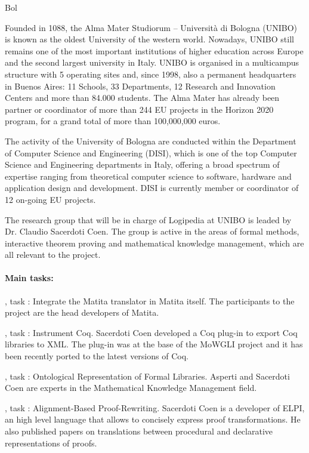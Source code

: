 \begin{sitedescription}{Bol}


Founded in 1088, the Alma Mater Studiorum – Università di Bologna (UNIBO) is known as the oldest University of the western world. Nowadays, UNIBO still remains one of the most important institutions of higher education across Europe and the second largest university in Italy. UNIBO is organised in a multicampus structure with 5 operating sites and, since 1998, also a permanent headquarters in Buenos Aires: 11 Schools, 33 Departments, 12 Research and Innovation Centers and more than 84.000 students. The Alma Mater has already been partner or coordinator of more than 244 EU projects in the Horizon 2020 program, for a grand total of more than 100,000,000 euros.

The activity of the University of Bologna are conducted within the Department of Computer Science and Engineering (DISI), which is one of the top Computer Science and Engineering departments in Italy, offering a broad spectrum of expertise ranging from theoretical computer science to software, hardware and application design and development. DISI is currently member or coordinator of 12 on-going EU projects.

The research group that will be in charge of Logipedia at UNIBO is leaded by Dr. Claudio Sacerdoti Coen. The group is active in the areas of formal methods, interactive theorem proving and mathematical knowledge management, which are all relevant to the project.

\paragraph*{Main tasks:}

\begin{compactitem}
\item {}, task : Integrate the Matita translator in Matita itself. The participants to the project are the head developers of Matita.
\item {}, task : Instrument Coq. Sacerdoti Coen developed a Coq plug-in to export Coq libraries to XML. The plug-in was at the base of the MoWGLI project and it has been recently ported to the latest versions of Coq.
\item {}, task : Ontological Representation of Formal Libraries. Asperti and Sacerdoti Coen are experts in the Mathematical Knowledge Management field.
\item {}, task : Alignment-Based  Proof-Rewriting. Sacerdoti Coen is a developer of ELPI, an high level language that allows to concisely express proof transformations. He also published papers on translations between procedural and declarative representations of proofs. 
\end{compactitem}


\end{sitedescription}
